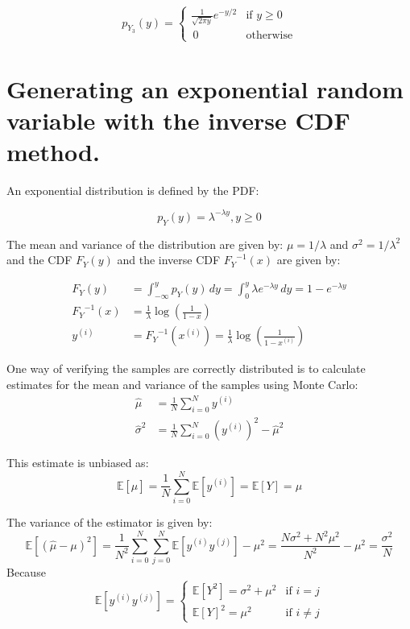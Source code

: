 \documentclass[12pt]{article}
\begin{document}
  
\begin{equation}
 p_{Y_3}(y) =
  \begin{cases} 
    \frac 1 {\sqrt{2 \pi y}} e ^ { - y /2} &\mbox{if } y \ge 0 \\
    \, 0 &\mbox{otherwise}
  \end{cases}
\end{equation}

\section{Generating an exponential random variable with the inverse CDF method.}

An exponential distribution is defined by the PDF:

\begin{equation}
  p_Y(y)  = \lambda  ^ {- \lambda y}, y \ge 0	
\end{equation}

The mean and variance of the distribution are given by: $\mu = 1 / \lambda$ and $\sigma ^ 2 = 1 / \lambda ^ 2$ and the CDF $F_Y(y)$ and the inverse CDF ${F_Y}^{-1}(x)$ are given by:

\begin{align}
  F_Y (y) &= \int _ {- \infty} ^ y p_Y (y) \, dy =  \int _ 0 ^ y \lambda e ^ {- \lambda y} \, dy = 1 - e ^ {- \lambda y} \\
  {F_Y} ^ {-1} (x) &= \frac 1  \lambda \log {\left( \frac 1 {1 - x} \right)} \\
  y^{(i)} &= {F_Y} ^ {-1} (x ^ {(i)}) = \frac 1  \lambda  \log \left(\frac 1 {1 - x ^ {(i)}}  \right)
\end{align}

One way of verifying the samples are correctly distributed is to calculate estimates for the mean and variance of the samples using Monte Carlo:
\begin{align}
	\hat{\mu} &= \frac 1 N \sum ^ N _ {i=0} y^{(i)} \\
    \hat{\sigma}^2 &= \frac 1 N \sum ^ N _ {i=0} (y^{(i)})^2 - \hat \mu^2
\end{align}

This estimate is unbiased as:
\begin{equation}
	\mathbb{E}   [\hat{\mu}] = \frac 1 N \sum ^ N _ {i=0} \mathbb{E} [y^{(i)}] = \mathbb{E} [Y] = \mu
\end{equation}

The variance of the estimator is given by:
\begin{equation}
	\mathbb{E} [(\hat{\mu} - \mu)^2] =
    \frac 1 {N^2} \sum ^ N _ {i=0} \sum ^ N _ {j = 0} \mathbb{E} [y^{(i)}y^{(j)}] - \mu^2 =
   \frac {N\sigma^2 + N^2\mu^2} {N^2} - \mu^2 = 
   \frac {\sigma^2} N
\end{equation}
Because 
\begin{equation*}
  \mathbb{E} [y^{(i)}y^{(j)}]  = 
  \begin{cases} 
      \mathbb{E} [Y^2] = \sigma^2  +\mu^2 & \mbox{if } i = j \\
      \mathbb E [Y]^2 = \mu^2 & \mbox{if } i \ne j  	
  \end{cases}
\end{equation*}
\end{document}
